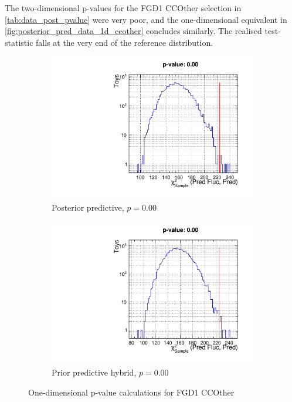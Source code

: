 The two-dimensional p-values for the FGD1 CCOther selection in \autoref{tab:data_post_pvalue} were very poor, and the one-dimensional equivalent in \autoref{fig:posterior_pred_data_1d_ccother} concludes similarly. The realised test-statistic falls at the very end of the reference distribution.
\begin{figure}[h]
	\begin{subfigure}[t]{0.49\textwidth}
		\includegraphics[width=\textwidth, trim={0mm 0mm 0mm 14mm}, clip,page=1]{figures/mach3/data/postpred/pvalue_posteriorpred_fgd1ccother_1d}
		\caption{Posterior predictive, $p=0.00$}
	\end{subfigure}
	\begin{subfigure}[t]{0.49\textwidth}
		\includegraphics[width=\textwidth, trim={0mm 0mm 0mm 14mm}, clip,page=1]{figures/mach3/data/postpred/prior_pred_fgd1ccother}
		\caption{Prior predictive hybrid, $p=0.00$}
	\end{subfigure}
	\caption{One-dimensional p-value calculations for FGD1 CCOther}
	\label{fig:posterior_pred_data_1d_ccother}
\end{figure}

